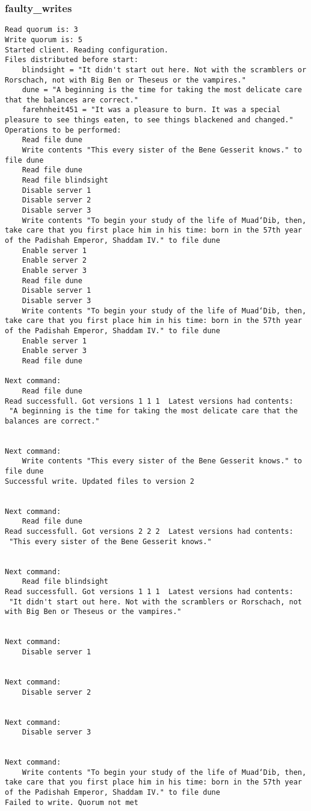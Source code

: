 \documentclass[a4paper,12pt,titlepage,finall]{article}
\begin{document}
\subsubsection{faulty\_writes}
\begin{lstlisting}
Read quorum is: 3
Write quorum is: 5
Started client. Reading configuration.
Files distributed before start:
	blindsight = "It didn't start out here. Not with the scramblers or Rorschach, not with Big Ben or Theseus or the vampires."
	dune = "A beginning is the time for taking the most delicate care that the balances are correct."
	farehnheit451 = "It was a pleasure to burn. It was a special pleasure to see things eaten, to see things blackened and changed."
Operations to be performed:
	Read file dune
	Write contents "This every sister of the Bene Gesserit knows." to file dune
	Read file dune
	Read file blindsight
	Disable server 1
	Disable server 2
	Disable server 3
	Write contents "To begin your study of the life of Muad‘Dib, then, take care that you first place him in his time: born in the 57th year of the Padishah Emperor, Shaddam IV." to file dune
	Enable server 1
	Enable server 2
	Enable server 3
	Read file dune
	Disable server 1
	Disable server 3
	Write contents "To begin your study of the life of Muad‘Dib, then, take care that you first place him in his time: born in the 57th year of the Padishah Emperor, Shaddam IV." to file dune
	Enable server 1
	Enable server 3
	Read file dune

Next command:
	Read file dune
Read successfull. Got versions 1 1 1  Latest versions had contents:
 "A beginning is the time for taking the most delicate care that the balances are correct."


Next command:
	Write contents "This every sister of the Bene Gesserit knows." to file dune
Successful write. Updated files to version 2


Next command:
	Read file dune
Read successfull. Got versions 2 2 2  Latest versions had contents:
 "This every sister of the Bene Gesserit knows."


Next command:
	Read file blindsight
Read successfull. Got versions 1 1 1  Latest versions had contents:
 "It didn't start out here. Not with the scramblers or Rorschach, not with Big Ben or Theseus or the vampires."


Next command:
	Disable server 1


Next command:
	Disable server 2


Next command:
	Disable server 3


Next command:
	Write contents "To begin your study of the life of Muad‘Dib, then, take care that you first place him in his time: born in the 57th year of the Padishah Emperor, Shaddam IV." to file dune
Failed to write. Quorum not met



\end{lstlisting}
\end{document}
